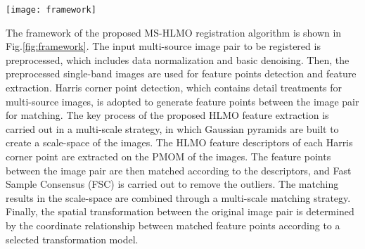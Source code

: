 \begin{figure*}[!h]
 \centering
 \centerline{\texttt{[image: framework]}}
 \caption{The proposed multi-source remote sensing image registration framework of MS-HLMO, including Harris feature point detection, Histogram of Local Main Orientation feature extraction, and multi-scale registration strategy.}
 \label{fig:framework}
\end{figure*}

The framework of the proposed MS-HLMO registration algorithm is shown in Fig.\ref{fig:framework}. The input multi-source image pair to be registered is preprocessed, which includes data normalization and basic denoising. Then, the preprocessed single-band images are used for feature points detection and feature extraction. Harris corner point detection, which contains detail treatments for multi-source images, is adopted to generate feature points between the image pair for matching. The key process of the proposed HLMO feature extraction is carried out in a multi-scale strategy, in which Gaussian pyramids are built to create a scale-space of the images. The HLMO feature descriptors of each Harris corner point are extracted on the PMOM of the images. The feature points between the image pair are then matched according to the descriptors, and Fast Sample Consensus (FSC) is carried out to remove the outliers. The matching results in the scale-space are combined through a multi-scale matching strategy. Finally, the spatial transformation between the original image pair is determined by the coordinate relationship between matched feature points according to a selected transformation model.



